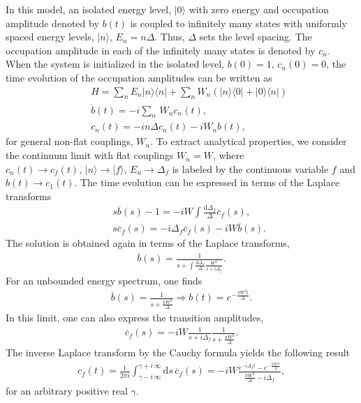 \documentclass[prl,aps,amssymb,twocolumn,superscriptaddress, notitlepage, longbibliography]{revtex4-2}
\begin{document}
In this model, an isolated energy level, $\lvert 0\rangle$ with zero energy and occupation amplitude denoted by $b(t)$ is coupled to infinitely many states with uniformly spaced energy levels, $\lvert n\rangle,\,E_n=n\Delta $. Thus, $\Delta$ sets the level spacing. The occupation amplitude in each of the infinitely many states is denoted by $c_n$.  When the system is initialized in the isolated level, $b(0)=1,\,c_n(0)=0$, the time evolution of the occupation amplitudes can be written as
\begin{eqnarray}
    &&H=\sum_nE_n\lvert n\rangle\langle n\rvert+\sum_n W_n\left(\lvert n\rangle \langle 0\rvert+\lvert 0\rangle \langle n\rvert\right)\\
    &&\dot b(t)=-i\sum_n\,W_nc_n(t),\\
    &&\dot c_n(t)=-i n\Delta c_n(t)-i W_nb(t),
\end{eqnarray}
for general non-flat couplings, $W_n$.
To extract analytical properties, we consider the continuum limit with flat couplings $W_n=W$, where $c_n(t)\rightarrow c_f(t),\,\lvert n \rangle\rightarrow\lvert f\rangle,\,E_n\rightarrow\Delta_f$ is labeled by the continuous variable $f$ and $b(t)\rightarrow c_1(t)$. The time evolution can be expressed in terms of the Laplace transforms
\begin{eqnarray}
    &&s\overline{b}(s)-1=-iW\int\frac{\mathrm d\Delta_f}{\Delta}\overline c_{f}(s),\\
    &&s\overline c_{f}(s)=-i\Delta_{f}\overline c_{f}(s)-iW\overline b(s).
\end{eqnarray}
The solution is obtained again in terms of the Laplace transforms,
\begin{eqnarray}
    \overline {b}(s)=\frac{1}{s+\int\frac{\mathrm d\Delta_f}{\Delta}\frac{W^2}{s+i\Delta_f}}.
\end{eqnarray}
For an unbounded energy spectrum, one finds
\begin{eqnarray}
    \overline{b}(s)=\frac{1}{s+\frac{\pi W^2}{\Delta}}\Rightarrow b(t)=e^{-\frac{\pi W^2t}{\Delta}}.
\end{eqnarray}
In this limit, one can also express the transition amplitudes,
\begin{eqnarray}
    \overline c_f(s)=-iW\frac{1}{s+i\Delta_f}\frac{1}{s+\frac{\pi W^2}{\Delta}}.
\end{eqnarray}
The inverse Laplace transform by the Cauchy formula yields the following result
\begin{eqnarray}
    c_f(t)=\frac{1}{2\pi i}\int_{\gamma-i\,\infty}^{\gamma+i\,\infty}\mathrm ds\,\overline c_f(s)=-iW\frac{e^{-i\Delta_ft}-e^{-\frac{\pi W^2t}{\Delta}}}{\frac{\pi W^2}{\Delta}-i\Delta_f},
\end{eqnarray}
for an arbitrary positive real $\gamma$.
\end{document}
